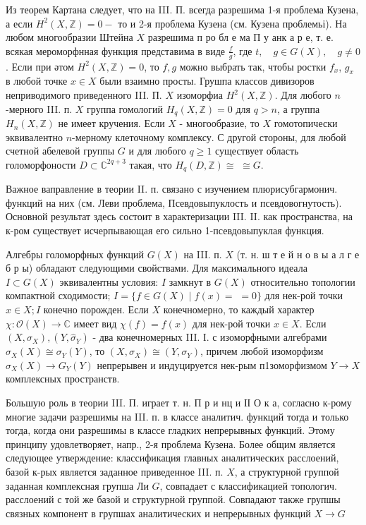 \documentclass[10pt]{article}
\begin{document}
Из теорем Картана следует, что на III. П. всегда разрешима 1-я проблема Кузена, а если $H^{2}(X, \mathbb{Z})=0-$ то и 2-я проблема Кузена (см. Кузена проблемьі). На любом многообразии Штейна $X$ разрешима п ро бл е ма П у анк а р е, т. е. всякая мероморфнная функция представима в виде $\frac{f}{g}$, где $t, \quad g \in G(X), \quad g \neq 0$. Если при әтом $H^{2}(X, \mathbb{Z})=0$, то $f, g$ можно выбрать так, чтобы ростки $f_{x}$, $g_{x}$ в любой точке $x \in X$ были взаимно просты. Грушпа классов дивизоров неприводимого приведенного III. П. $X$ изоморфиа $H^{2}(X, \mathbb{Z})$. Для любого $n$-мерного III. п. $X$ группа гомологий $H_{q}(X, \mathbb{Z})=0$ для $q>n$, а группа $H_{n}(X, \mathbb{Z})$ не имеет кручения. Если $X$ - многообразие, то $X$ гомотопически эквивалентно $n$-мерному клеточному комплексу. С другой стороны, для любой счетной абелевой группы $G$ и для любого $q \geqslant 1$ существует область голоморфоности $D \subset \mathbb{C}^{2 q+3}$ такая, что $H_{q}(D, \mathbb{Z}) \cong$ $\cong G$.



Важное ваправление в теории II. п. связано с изучением плюрисубгармонич. функций на них (см. Леви проблема, Псевдовыпуклость $и$ псевдовогнутость). Основной результат здесь состоит в характеризации III. II. как пространства, на к-ром существует исчерпывающая его сильно 1-псевдовыпуклая функция.



Алгебры голоморфных функций $G(X)$ на III. п. $X$ (т. н. ш т е й н о в ы а л г е б р ы) обладают следующими свойствами. Для максимального идеала $I \subset G(X)$ эквивалентны условия: $I$ замкнут в $G(X)$ относительно топологии компактной сходимости; $I=\{f \in G(X) \mid f(x)=$ $=0\}$ для нек-рой точки $x \in X ; I$ конечно порожден. Если $X$ конечномерно, то каждый характер $\chi: \mathcal{O}(X) \longrightarrow \mathbb{C}$ имеет вид $\chi(f)=f(x)$ для нек-рой точки $x \in X$. Если $\left(X, \sigma_{X}\right),\left(Y, \widehat{\sigma}_{Y}\right)$ - два конечномерных III. І. с изоморфными алгебрами $\sigma_{X}(X) \cong \sigma_{Y}(Y)$, то $\left(X, \sigma_{X}\right) \cong\left(Y, \sigma_{Y}\right)$, причем любой изоморфизм $\hat{\sigma}_{X}(X) \rightarrow G_{Y}(Y)$ непрерывен и индуцируется нек-рым п1зоморфизмом $Y \rightarrow X$ комплексных пространств.



Большую роль в теории III. П. играет т. н. П р и нц и ІІ О к а, согласно к-рому многие задачи разрешимы на III. п. в классе аналитич. функций тогда и только тогда, когда они разрешимы в классе гладких непрерывных функций. Этому принципу удовлетворяет, напр., 2-я проблема Кузена. Более общим является следующее утверждение: классификация главных аналитических расслоений, базой к-рых является заданное приведенное III. п. $X$, а структурной группой заданная комплексная групша Ли $G$, совпадает с классификацией топологич. расслоений с той же базой и структурной группой. Совпадают также групшы связных компонент в групшах аналитических и непрерывных функций $X \rightarrow G$
\end{document}
